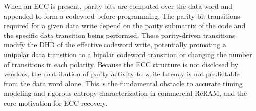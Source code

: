 When an ECC is present, parity bits are computed over the data word and
appended to form a codeword before programming. The parity bit
transitions required for a given data write depend on the parity
submatrix of the code and the specific data transition being performed.
These parity-driven transitions modify the DHD of the effective codeword
write, potentially promoting a unipolar data transition to a bipolar
codeword transition or changing the number of transitions in each
polarity. Because the ECC structure is not disclosed by vendors, the
contribution of parity activity to write latency is not predictable from
the data word alone. This is the fundamental obstacle to accurate timing
modeling and rigorous entropy characterization in commercial ReRAM, and
the core motivation for ECC recovery.